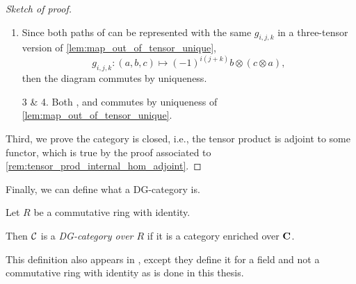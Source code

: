 \begin{proof}[Sketch of proof]
\begin{enumerate}
{\begin{center}
            \end{center}
            commutes.

            Let \( a \in A_i \) and \( b \in B_j \), and consider the following equation,
            \begin{align*}
                (g \otimes f)_{i + j} \circ s_{i + j} (a \otimes b) &= (g \otimes f)_{i + j} ((-1)^{ij}b \otimes a) \\
                &= (-1)^{ij} g_j(b) \otimes f_i(a) \\
                &= s_{i + j}(f_i(a) \otimes g_j(b)) \\
                &= s_{i + j} \circ (f \otimes g)_{i + j} (a \otimes b).
            \end{align*}
            By the above equation, along with the uniqueness of \autoref{lem:map_out_of_tensor_unique}, the above diagram commutes.
        }
        \item {
            Since both paths of \cite[Diagram 6.3]{Borceux_1994} can be represented with the same \( g_{i, j, k} \) in a three-tensor version of \autoref{lem:map_out_of_tensor_unique},
            \[
                g_{i, j, k}: (a, b, c) \mapsto (-1)^{i(j + k)}b \otimes (c \otimes a),
            \]
            then the diagram commutes by uniqueness.
        }
        \item[3 \& 4.] {
            Both \cite[Diagram 6.4]{Borceux_1994}, and \cite[Diagram 6.5]{Borceux_1994} commutes by uniqueness of \autoref{lem:map_out_of_tensor_unique}.
        }
    \end{enumerate}

    Third, we prove the category is closed, i.e., the tensor product is adjoint to some functor, which is true by the proof associated to \autoref{rem:tensor_prod_internal_hom_adjoint}.
\end{proof}

Finally, we can define what a DG-category is.

\begin{definition}[DG-category]
    \label{def:dg_cat}
    Let \( R \) be a commutative ring with identity.

    Then \( {\mathcal{C}} \) is a \emph{DG-category over \( R \)} if it is a category enriched over \( \operatorname{\mathbf{C}} \).
\end{definition}

This definition also appears in \cite[p. 29]{Jasso-Muro_2023}, except they define it for a field and not a commutative ring with identity as is done in this thesis.

